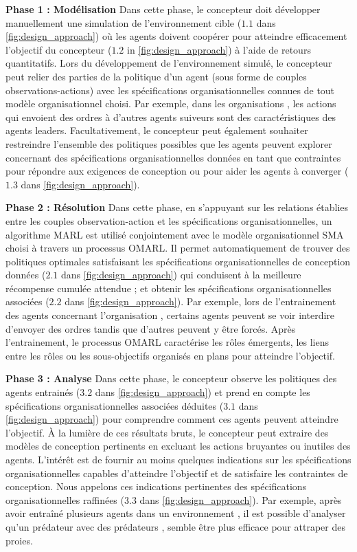 \documentclass[contribution]{jfsma}
\newcounter{relation}
\begin{document}
\textbf{Phase 1 : Modélisation} \quad Dans cette phase, le concepteur doit développer manuellement une simulation de l'environnement cible ($1.1$ dans \autoref{fig:design_approach}) où les agents doivent coopérer pour atteindre efficacement l'objectif du concepteur ($1.2 $ in \autoref{fig:design_approach}) à l'aide de retours quantitatifs. Lors du développement de l'environnement simulé, le concepteur peut relier des parties de la politique d'un agent (sous forme de couples observations-actions) avec les spécifications organisationnelles connues de tout modèle organisationnel choisi.
Par exemple, dans les organisations , les actions qui envoient des ordres à d'autres agents suiveurs sont des caractéristiques des agents leaders.
Facultativement, le concepteur peut également souhaiter restreindre l'ensemble des politiques possibles que les agents peuvent explorer concernant des spécifications organisationnelles données en tant que contraintes pour répondre aux exigences de conception ou pour aider les agents à converger ($1.3$ dans \autoref{fig:design_approach}).

\textbf{Phase 2 : Résolution} \quad Dans cette phase, en s'appuyant sur les relations établies entre les couples observation-action et les spécifications organisationnelles, un algorithme MARL est utilisé conjointement avec le modèle organisationnel SMA choisi à travers un processus OMARL. Il permet automatiquement de trouver des politiques optimales satisfaisant les spécifications organisationnelles de conception données ($2.1$ dans \autoref{fig:design_approach}) qui conduisent à la meilleure récompense cumulée attendue ; et obtenir les spécifications organisationnelles associées ($2.2$ dans \autoref{fig:design_approach}). Par exemple, lors de l'entrainement des agents concernant l'organisation , certains agents peuvent se voir interdire d'envoyer des ordres tandis que d'autres peuvent y être forcés. Après l'entrainement, le processus OMARL caractérise les rôles émergents, les liens entre les rôles ou les sous-objectifs organisés en plans pour atteindre l'objectif.

\textbf{Phase 3 : Analyse} \quad Dans cette phase, le concepteur observe les politiques des agents entrainés ($3.2$ dans \autoref{fig:design_approach}) et prend en compte les spécifications organisationnelles associées déduites ($3.1$ dans \autoref{fig:design_approach}) pour comprendre comment ces agents peuvent atteindre l'objectif. À la lumière de ces résultats bruts, le concepteur peut extraire des modèles de conception pertinents en excluant les actions bruyantes ou inutiles des agents. L'intérêt est de fournir au moins quelques indications sur les spécifications organisationnelles capables d'atteindre l'objectif et de satisfaire les contraintes de conception. Nous appelons ces indications pertinentes des spécifications organisationnelles raffinées ($3.3$ dans \autoref{fig:design_approach}). Par exemple, après avoir entraîné plusieurs agents dans un environnement , il est possible d'analyser qu'un prédateur  avec des prédateurs , semble être plus efficace pour attraper des proies.
\end{document}
